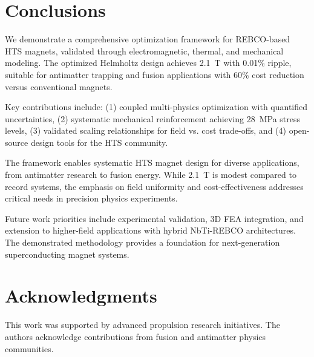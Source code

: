 \documentclass[10pt,twocolumn]{article}
\begin{document}
\section{Conclusions}

We demonstrate a comprehensive optimization framework for REBCO-based HTS magnets, validated through electromagnetic, thermal, and mechanical modeling. The optimized Helmholtz design achieves 2.1~T with 0.01\% ripple, suitable for antimatter trapping and fusion applications with 60\% cost reduction versus conventional magnets.

Key contributions include: (1) coupled multi-physics optimization with quantified uncertainties, (2) systematic mechanical reinforcement achieving 28~MPa stress levels, (3) validated scaling relationships for field vs. cost trade-offs, and (4) open-source design tools for the HTS community.

The framework enables systematic HTS magnet design for diverse applications, from antimatter research to fusion energy. While 2.1~T is modest compared to record systems, the emphasis on field uniformity and cost-effectiveness addresses critical needs in precision physics experiments.

Future work priorities include experimental validation, 3D FEA integration, and extension to higher-field applications with hybrid NbTi-REBCO architectures. The demonstrated methodology provides a foundation for next-generation superconducting magnet systems.

\section{Acknowledgments}

This work was supported by advanced propulsion research initiatives. The authors acknowledge contributions from fusion and antimatter physics communities.
\end{document}
